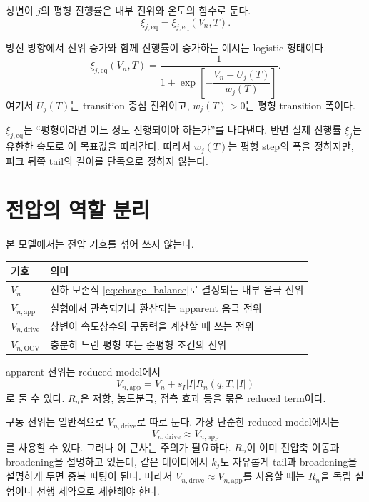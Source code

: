 \documentclass[11pt]{article}
\newcommand{\app}{\mathrm{app}}
\newcommand{\drive}{\mathrm{drive}}
\newcommand{\OCV}{\mathrm{OCV}}
\begin{document}
상변이 \(j\)의 평형 진행률은 내부 전위와 온도의 함수로 둔다.
\begin{equation}
\xi_{j,\mathrm{eq}}
=
\xi_{j,\mathrm{eq}}(V_n,T).
\end{equation}

방전 방향에서 전위 증가와 함께 진행률이 증가하는 예시는 logistic 형태이다.
\begin{equation}
\xi_{j,\mathrm{eq}}(V_n,T)
=
\frac{1}{
1+\exp\!\left[-\dfrac{V_n-U_j(T)}{w_j(T)}\right]
}.
\label{eq:xi_eq_logistic}
\end{equation}
여기서 \(U_j(T)\)는 transition 중심 전위이고, \(w_j(T)>0\)는 평형 transition 폭이다.

\(\xi_{j,\mathrm{eq}}\)는 ``평형이라면 어느 정도 진행되어야 하는가''를 나타낸다. 반면 실제 진행률 \(\xi_j\)는 유한한 속도로 이 목표값을 따라간다. 따라서 \(w_j(T)\)는 평형 step의 폭을 정하지만, 피크 뒤쪽 tail의 길이를 단독으로 정하지 않는다.

\section{전압의 역할 분리}

본 모델에서는 전압 기호를 섞어 쓰지 않는다.

\begin{longtable}{p{}p{}}
\toprule
기호 & 의미 \\
\midrule
\endhead
\(V_n\) & 전하 보존식 \eqref{eq:charge_balance}로 결정되는 내부 음극 전위 \\
\(V_{n,\app}\) & 실험에서 관측되거나 환산되는 apparent 음극 전위 \\
\(V_{n,\drive}\) & 상변이 속도상수의 구동력을 계산할 때 쓰는 전위 \\
\(V_{n,\OCV}\) & 충분히 느린 평형 또는 준평형 조건의 전위 \\
\bottomrule
\end{longtable}

apparent 전위는 reduced model에서
\begin{equation}
V_{n,\app}
=
V_n+s_I|I|R_n(q,T,|I|)
\label{eq:Vapp}
\end{equation}
로 둘 수 있다. \(R_n\)은 저항, 농도분극, 접촉 효과 등을 묶은 reduced term이다.

구동 전위는 일반적으로 \(V_{n,\drive}\)로 따로 둔다. 가장 단순한 reduced model에서는
\begin{equation}
V_{n,\drive}\approx V_{n,\app}
\label{eq:drive_app}
\end{equation}
를 사용할 수 있다. 그러나 이 근사는 주의가 필요하다. \(R_n\)이 이미 전압축 이동과 broadening을 설명하고 있는데, 같은 데이터에서 \(k_j\)도 자유롭게 tail과 broadening을 설명하게 두면 중복 피팅이 된다. 따라서 \(V_{n,\drive}\approx V_{n,\app}\)를 사용할 때는 \(R_n\)을 독립 실험이나 선행 제약으로 제한해야 한다.
\end{document}
